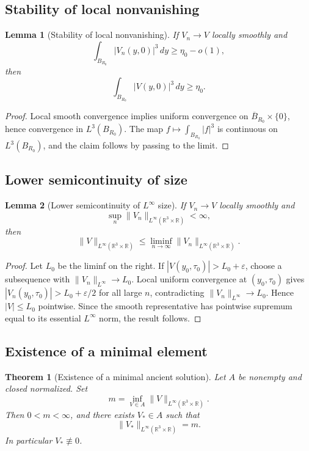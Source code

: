 \documentclass[11pt]{amsart}
\theoremstyle{plain}
\newtheorem{theorem}{Theorem}[section]
\newtheorem{lemma}[lemma]{Lemma}
\theoremstyle{definition}
\theoremstyle{remark}
\numberwithin{equation}{section}
\newcommand{\R}{\mathbb R}
\newcommand{\eps}{\varepsilon}
\begin{document}
\subsection{Stability of local nonvanishing}

\begin{lemma}[Stability of local nonvanishing]\label{p2:lem:nonzero-stability}
If \(V_n\to V\) locally smoothly and
\[
   \int_{B_{R_0}}|V_n(y,0)|^3\,dy\ge \eta_0-o(1),
\]
then
\[
   \int_{B_{R_0}}|V(y,0)|^3\,dy\ge \eta_0 .
\]
\end{lemma}

\begin{proof}
Local smooth convergence implies uniform convergence on
\(\overline B_{R_0}\times\{0\}\), hence convergence in
\(L^3(B_{R_0})\).  The map \(f\mapsto\int_{B_{R_0}}|f|^3\) is continuous on
\(L^3(B_{R_0})\), and the claim follows by passing to the limit.
\end{proof}

\subsection{Lower semicontinuity of size}

\begin{lemma}[Lower semicontinuity of \(L^\infty\) size]
\label{p2:lem:lsc-size}
If \(V_n\to V\) locally smoothly and
\[
   \sup_n\|V_n\|_{L^\infty(\R^3\times\R)}<\infty,
\]
then
\[
   \|V\|_{L^\infty(\R^3\times\R)}
   \le
   \liminf_{n\to\infty}
   \|V_n\|_{L^\infty(\R^3\times\R)}.
\]
\end{lemma}

\begin{proof}
Let \(L_0\) be the liminf on the right.  If
\(|V(y_0,\tau_0)|>L_0+\eps\), choose a subsequence with
\(\|V_n\|_{L^\infty}\to L_0\).  Local uniform convergence at
\((y_0,\tau_0)\) gives
\(|V_n(y_0,\tau_0)|>L_0+\eps/2\) for all large \(n\), contradicting
\(\|V_n\|_{L^\infty}\to L_0\).  Hence \(|V|\le L_0\) pointwise.  Since the
smooth representative has pointwise supremum equal to its essential
\(L^\infty\) norm, the result follows.
\end{proof}

\subsection{Existence of a minimal element}

\begin{theorem}[Existence of a minimal ancient solution]
\label{p2:thm:minimal-existence}
Let \(A\) be nonempty and closed normalized.  Set
\[
   m=
   \inf_{V\in A}
   \|V\|_{L^\infty(\R^3\times\R)}.
\]
Then \(0<m<\infty\), and there exists \(V_*\in A\) such that
\[
   \|V_*\|_{L^\infty(\R^3\times\R)}=m.
\]
In particular \(V_*\not\equiv0\).
\end{theorem}
\end{document}
